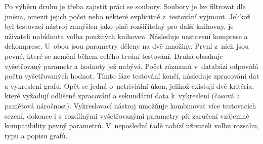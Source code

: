Po výběru druhu je třeba zajistit práci se soubory. Soubory je lze filtrovat dle jména, omezit jejich počet nebo některé explicitně z~testování vyjmout. Jelikož byl testovací nástroj zamýšlen jako plně rozšiřitelný pro další knihovny, je uživateli nabídnuta volba použitých knihoven. Následuje nastavení komprese a dekomprese. U~obou jsou parametry děleny na dvě množiny. První z~nich jsou pevné, které se nemění během celého trvání testování. Druhá obsahuje vyšetřovaný parametr a hodnoty jež nabývá. Počet záznamů v~databázi odpovídá počtu vyšetřovaných hodnot. Tímto fáze testování končí, následuje zpracování dat a vykreslení grafu. Opět se jedná o~netriviální úkon, jelikož existují dvě kritéria, které vyžadují odlišené zpracování a sekundární data k~vykreslení (časová a paměťová náročnost). Vykreslovací nástroj umožňuje kombinovat více testovacích sezení, dokonce i s~rozdílnými vyšetřovanými parametry při zaručení vzájemné kompatibility pevný parametrů. V~neposlední řadě nabízí uživateli volbu rozsahu, typu a popisu grafů.




